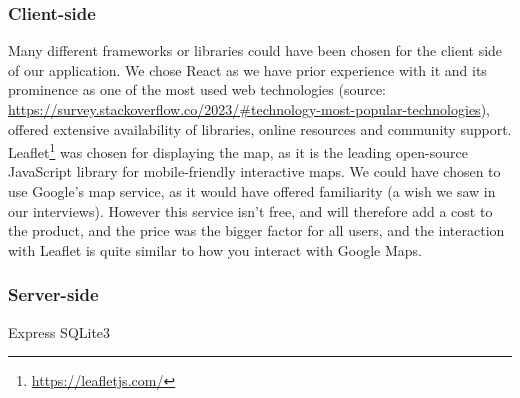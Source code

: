 \subsubsection{Client-side}
Many different frameworks or libraries could have been chosen for the client side of our application. We chose React as we have prior experience with it and its prominence as one of the most used web technologies (source: \url{https://survey.stackoverflow.co/2023/#technology-most-popular-technologies}), offered extensive availability of libraries, online resources and community support.
Leaflet\footnote{\url{https://leafletjs.com/}} was chosen for displaying the map, as it is the leading open-source JavaScript library for mobile-friendly interactive maps. We could have chosen to use Google's map service, as it would have offered familiarity (a wish we saw in our interviews). However this service isn't free, and will therefore add a cost to the product, and the price was the bigger factor for all users, and the interaction with Leaflet is quite similar to how you interact with Google Maps.

\subsubsection{Server-side}
Express
SQLite3